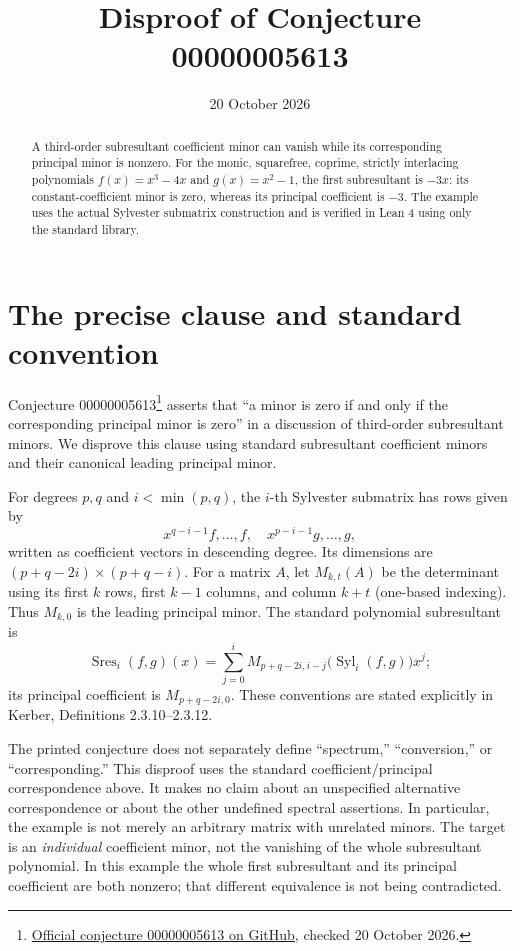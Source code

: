 \documentclass[11pt,letterpaper]{article}
\title{Disproof of Conjecture 00000005613}
\author{}
\date{20 October 2026}
\newcommand{\Syl}{\operatorname{Syl}}
\newcommand{\Sres}{\operatorname{Sres}}
\begin{document}
\maketitle
\vspace{-1.5em}
\begin{abstract}
A third-order subresultant coefficient minor can vanish while its
corresponding principal minor is nonzero. For the monic, squarefree,
coprime, strictly interlacing polynomials $f(x)=x^3-4x$ and
$g(x)=x^2-1$, the first subresultant is $-3x$: its constant-coefficient
minor is zero, whereas its principal coefficient is $-3$. The example
uses the actual Sylvester submatrix construction and is verified in
Lean 4 using only the standard library.
\end{abstract}

\section{The precise clause and standard convention}
Conjecture 00000005613\footnote{\href{https://github.com/The-Last-Math-Competition/The-Last-Math-Competition/blob/main/conjectures/00000005613.md}{Official conjecture 00000005613 on GitHub}, checked 20 October 2026.}
asserts that ``a minor is zero if and only if the corresponding
principal minor is zero'' in a discussion of third-order subresultant
minors. We disprove this clause using standard subresultant coefficient
minors and their canonical leading principal minor.

For degrees $p,q$ and $i<\min(p,q)$, the $i$-th Sylvester submatrix
has rows given by
\[
 x^{q-i-1}f,\ldots,f,\quad x^{p-i-1}g,\ldots,g,
\]
written as coefficient vectors in descending degree. Its dimensions
are $(p+q-2i)\times(p+q-i)$. For a matrix $A$, let $M_{k,t}(A)$ be
the determinant using its first $k$ rows, first $k-1$ columns, and
column $k+t$ (one-based indexing). Thus $M_{k,0}$ is the leading
principal minor. The standard polynomial subresultant is
\[
 \Sres_i(f,g)(x)=\sum_{j=0}^{i}
 M_{p+q-2i,i-j}\bigl(\Syl_i(f,g)\bigr)x^j;
\]
its principal coefficient is $M_{p+q-2i,0}$.
These conventions are stated explicitly in Kerber,
Definitions 2.3.10--2.3.12\cite{Kerber}.

The printed conjecture does not separately define ``spectrum,''
``conversion,'' or ``corresponding.'' This disproof uses the standard
coefficient/principal correspondence above. It makes no claim about an
unspecified alternative correspondence or about the other undefined
spectral assertions. In particular, the example is not merely an
arbitrary matrix with unrelated minors. The target is an \emph{individual}
coefficient minor, not the vanishing of the whole subresultant polynomial.
In this example the whole first subresultant and its principal coefficient
are both nonzero; that different equivalence is not being contradicted.
\end{document}
